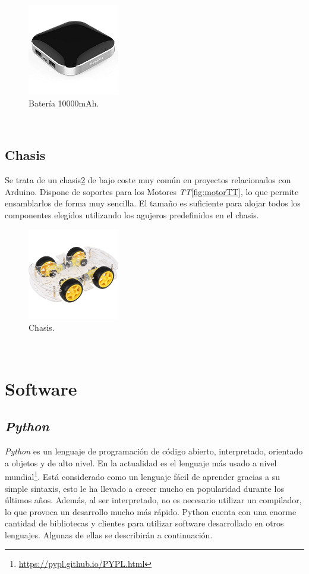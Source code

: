 \begin{figure} [h!]
	\begin{center}
		\includegraphics[width=4cm]{figs/battery}
	\end{center}
	\caption{Batería 10000mAh.}
	\label{fig:battery}
\end{figure}\

\subsection{Chasis}
\label{subsection:chasis}
Se trata de un chasis\ref{fig:chasis} de bajo coste muy común en proyectos relacionados con Arduino. Dispone de soportes para los Motores \textit{TT}\ref{fig:motorTT}, lo que permite ensamblarlos de forma muy sencilla. El tamaño es suficiente para alojar todos los componentes elegidos utilizando los agujeros predefinidos en el chasis.\\

\begin{figure} [h!]
	\begin{center}
		\includegraphics[width=4cm]{figs/chasis}
	\end{center}
	\caption{Chasis.}
	\label{fig:chasis}
\end{figure}\

\section{Software}

\subsection{\textit{Python}}
\label{subsection:python}
\textit{Python} es un lenguaje de programación de código abierto, interpretado, orientado a objetos y de alto nivel. En la actualidad es el lenguaje más usado a nivel mundial\footnote{\url{https://pypl.github.io/PYPL.html}}. Está considerado como un lenguaje fácil de aprender gracias a su simple sintaxis, esto le ha llevado a crecer mucho en popularidad durante los últimos años. Además, al ser interpretado, no es necesario utilizar un compilador, lo que provoca un desarrollo mucho más rápido. Python cuenta con una enorme cantidad de bibliotecas y clientes para utilizar software desarrollado en otros lenguajes. Algunas de ellas se describirán a continuación.\\

